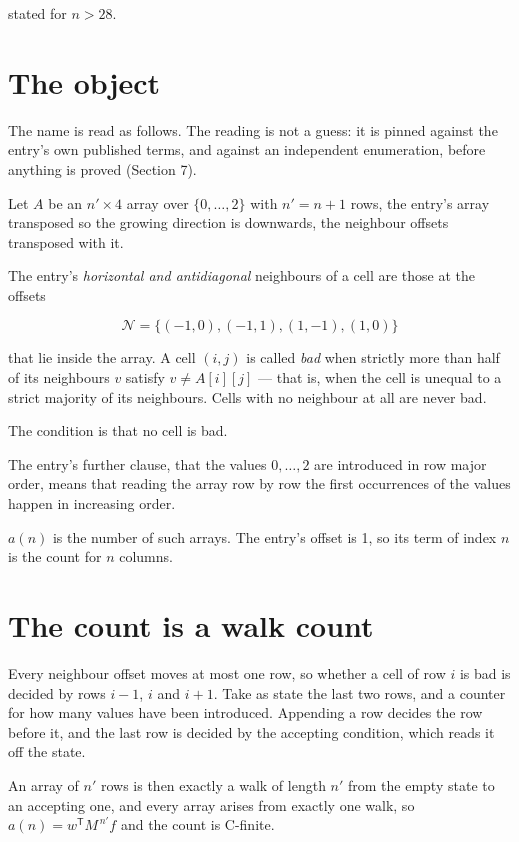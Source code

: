 \documentclass[11pt]{article}
\theoremstyle{definition}
\begin{document}
stated for $n > 28$.

\section{The object}

The name is read as follows. The reading is not a guess: it is pinned against the entry's own published terms, and against an independent enumeration, before anything is proved (Section 7).

Let $A$ be an $n' \times 4$ array over $\{0,\dots,2\}$ with $n' = n + 1$ rows, the entry's array transposed so the growing direction is downwards, the neighbour offsets transposed with it.

The entry's {\itshape horizontal and antidiagonal} neighbours of a cell are those at the offsets

\[\mathcal{N} = \{(-1,0), (-1,1), (1,-1), (1,0)\}\]

that lie inside the array. A cell $(i,j)$ is called {\itshape bad} when strictly more than half of its neighbours $v$ satisfy $v \ne A[i][j]$ --- that is, when the cell is unequal to a strict majority of its neighbours. Cells with no neighbour at all are never bad.

The condition is that no cell is bad.

The entry's further clause, that the values $0,\dots,2$ are introduced in row major order, means that reading the array row by row the first occurrences of the values happen in increasing order.

$a(n)$ is the number of such arrays. The entry's offset is 1, so its term of index $n$ is the count for $n$ columns.

\section{The count is a walk count}

Every neighbour offset moves at most one row, so whether a cell of row $i$ is bad is decided by rows $i-1$, $i$ and $i+1$. Take as state the last two rows, and a counter for how many values have been introduced. Appending a row decides the row before it, and the last row is decided by the accepting condition, which reads it off the state.

An array of $n'$ rows is then exactly a walk of length $n'$ from the empty state to an accepting one, and every array arises from exactly one walk, so $a(n) = w^{\mathsf T}M^{\,n'}f$ and the count is C-finite.
\end{document}
